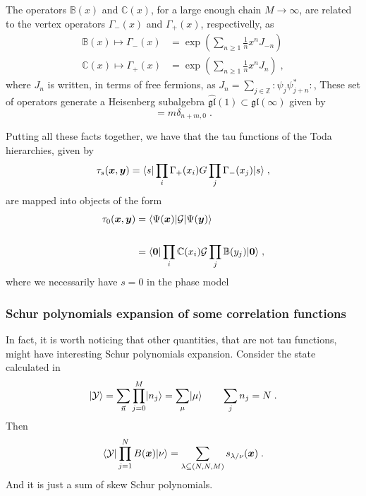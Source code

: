 \documentclass[a4paper,11pt]{amsart}
\begin{document}
The operators \(\mathbb{B}(x)\) and \(\mathbb{C}(x)\), 
for a large enough chain \(M\to \infty\),
are related to the vertex operators
\(\Gamma_-(x)\) and \(\Gamma_+(x)\), respectivelly, as
\begin{equation}
  \begin{split}
    \mathbb{B}(x) \mapsto \Gamma_-(x) & = \exp \left( \sum_{n\geq 1} \frac{1}{n}x^n J_{-n}\right) \\
    \mathbb{C}(x) \mapsto \Gamma_+(x) & = \exp \left( \sum_{n\geq 1} \frac{1}{n}x^n J_{n}\right) \; ,
  \end{split}
\end{equation}
where \(J_n \) is written, in terms of free fermions, as \(J_n =
\sum_{j\in \mathbb{Z}} \bm{\colon} \psi_j \psi_{j+n}^\ast
\bm{\colon}\),
These set of operators generate a Heisenberg subalgebra
\(\widehat{\mathfrak{gl}}(1) \subset \mathfrak{gl}(\infty)\) given by
\begin{equation}
  [J_m, J_n] = m \delta_{n+m,0}\; .
\end{equation}

Putting all these facts together, we have that the tau functions of the Toda 
hierarchies, given by
\begin{equation}
  \tau_s(\bm{x}, \bm{y}) = \langle s\rvert \prod_{i} \Gamma_+(x_i) G \prod_j \Gamma_-(x_j) \lvert s\rangle\; ,
\end{equation}
are mapped into objects of the form 
\begin{equation}
\begin{split}
  \tau_0(\bm{x}, \bm{y}) & = \langle\Psi(\bm{x})\rvert \mathcal{G} \lvert\Psi(\bm{y})\rangle \\
  \\ & = \langle\bm{0}\rvert \prod_{i} \mathbb{C}(x_i)
  \mathcal{G} \prod_j \mathbb{B}(y_j) \lvert\bm{0}\rangle\; ,
\end{split}
\end{equation}
where we necessarily have \(s=0\) in the phase model


\subsubsection{Schur polynomials expansion of some correlation functions}
In fact, it is worth noticing that other quantities, that are not tau
functions, might have interesting Schur polynomials expansion.
Consider the state calculated in~\cite{Bogoliubov2005}
\begin{equation}
  \lvert\mathcal{Y}\rangle =
 \sum_{\vec{n}} \prod_{j=0}^M \lvert n_j\rangle = \sum_\mu \lvert\mu\rangle \qquad \sum_j n_j = N\; .
\end{equation}
Then
\begin{equation}
 \langle\mathcal{Y}\rvert \prod_{j=1}^N B(\bm{x}) \lvert\nu\rangle = 
  \sum_{\lambda\subseteq (N,N,M)} s_{\lambda/\nu}(\bm{x})\; . 
\end{equation}
And it is just a sum of skew Schur polynomials.
\end{document}
